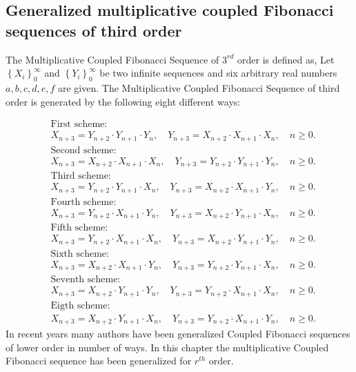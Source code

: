 	\subsection*{Generalized multiplicative coupled Fibonacci sequences of third order}	
	\begin{definition}
The Multiplicative Coupled Fibonacci  Sequence of $3^{rd}$  order is defined as,
Let $\left\{X_{i}\right\}_{0}^{\infty}$ and $\left\{Y_{i}\right\}_{0}^{\infty}$ be two infinite sequences and six arbitrary real numbers $a,b,c,d,e,f$ are given. The Multiplicative Coupled Fibonacci  Sequence of third order is generated by the following eight different ways:
\end{definition}
	\begin{align*}
   &\text{First scheme:}\\
	&X_{n+3}=Y_{n+2}\cdot Y_{n+1}\cdot Y_{n},
	\quad Y_{n+3}=X_{n+2}\cdot X_{n+1}\cdot X_{n},\quad n\geq 0.\\
		&\text{Second scheme:}\\
	&X_{n+3}=X_{n+2}\cdot X_{n+1}\cdot X_{n},\quad Y_{n+3}=Y_{n+2}\cdot Y_{n+1}\cdot Y_{n},\quad n\geq 0.\\
		&\text{Third scheme:}\\
	&X_{n+3}=Y_{n+2}\cdot Y_{n+1}\cdot X_{n},\quad Y_{n+3}=X_{n+2}\cdot X_{n+1}\cdot Y_{n},\quad n\geq 0.\\
	&\text{Fourth scheme:}\\
	&X_{n+3}=Y_{n+2}\cdot X_{n+1}\cdot Y_{n}, \quad Y_{n+3}=X_{n+2}\cdot Y_{n+1}\cdot X_{n},\quad n\geq 0.\\
&\text{Fifth scheme:}\\
	&X_{n+3}=Y_{n+2}\cdot X_{n+1}\cdot X_{n},\quad Y_{n+3}=X_{n+2}\cdot Y_{n+1}\cdot Y_{n},\quad n\geq 0.\\
&\text{Sixth scheme:}\\
	&X_{n+3}=X_{n+2}\cdot X_{n+1}\cdot Y_{n},\quad Y_{n+3}=Y_{n+2}\cdot Y_{n+1}\cdot X_{n},\quad n\geq 0.\\
&\text{Seventh scheme:}\\
	&X_{n+3}=X_{n+2}\cdot Y_{n+1}\cdot Y_{n},\quad Y_{n+3}=Y_{n+2}\cdot X_{n+1}\cdot X_{n},\quad n\geq 0.\\
&\text{Eigth scheme:}\\
	&X_{n+3}=X_{n+2}\cdot Y_{n+1}\cdot X_{n},\quad Y_{n+3}=Y_{n+2}\cdot X_{n+1}\cdot Y_{n},\quad n\geq 0.
	\end{align*}
In recent years many authors have been generalized Coupled Fibonacci sequences of lower order  in number of ways. In this chapter the multiplicative Coupled Fibonacci sequence has been generalized for $r^{th}$  order.
